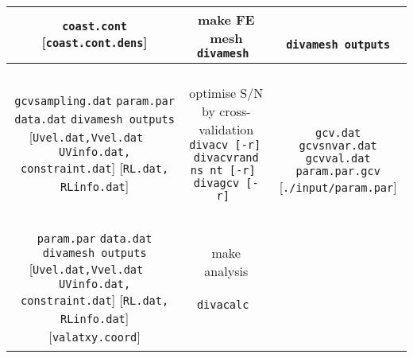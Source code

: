 \begin{table}[H]
{{\begin{tabular}{c|c|c}
{{\tt coast.cont} \\
{ [{\tt coast.cont.dens}]  } 
}
 & 
\shortstack{
{\sf make FE mesh} \\
{\tt divamesh    } 
\\
{  { }  }
}
& 
\shortstack{
{  { }  } \\
{\tt divamesh outputs} \\
{  { }  } 
} 
\\ \hline
 \shortstack{
 {\tt gcvsampling.dat} \\
 {\tt param.par} \\
 {\tt data.dat} \\
 {\tt divamesh outputs} \\
 {[{\tt Uvel.dat,Vvel.dat}} \\
 { $\quad ${\tt UVinfo.dat, constraint.dat}]} \\
 {[{\tt RL.dat, RLinfo.dat}]} 
 }
 & 
\shortstack{
{  { }  } \\
{\sf optimise S/N by cross-validation} \\
{\tt divacv [-r]   } \\
{\tt divacvrand ns nt [-r] }  \\
{\tt divagcv [-r]   } \\
{  { }  } \\
{  { }  }
}
& 
\shortstack{
{  { }  } \\
{  { }  } \\
{\tt gcv.dat} \\
{\tt gcvsnvar.dat} \\
{\tt gcvval.dat} \\
{\tt param.par.gcv} {[{\tt ./input/param.par}] } \\
{  { }  } 
} 
\\ \hline
 \shortstack{
 {  { }  } \\
 {\tt param.par} \\
 {\tt data.dat} \\
 {\tt divamesh outputs} \\
 {[{\tt Uvel.dat,Vvel.dat}} \\
 { $\quad ${\tt UVinfo.dat, constraint.dat}]} \\
 {[{\tt RL.dat, RLinfo.dat}]} \\
 {[{\tt valatxy.coord}] }
}
 & 
\shortstack{
{  { }  } \\
{\sf make analysis} \\
{  { }  } \\
{\tt divacalc    } 
\\
{  { }  } \\
{  { }  } \\
}
\end{tabular}}}
\end{table}
